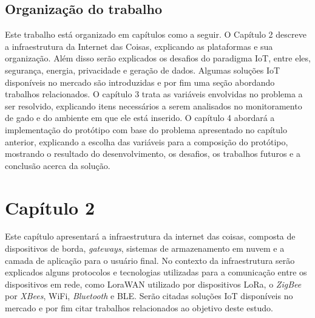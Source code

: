 \documentclass[
    hidelinks,
	12pt,				%
	openany,
	oneside, 
	a4paper,			%
	english,			%
	french,				%
	spanish,			%
	brazil				%
	]{abntex2}
\begin{document}
\section{Organização do trabalho}

Este trabalho está organizado em capítulos como a seguir. O Capítulo 2 descreve a infraestrutura da Internet das Coisas, explicando as plataformas e sua organização. Além disso serão explicados os desafios do paradigma IoT, entre eles,  segurança, energia, privacidade e geração de dados. Algumas soluções IoT disponíveis no mercado são introduzidas e por fim uma seção abordando trabalhos relacionados. O capítulo 3 trata as variáveis envolvidas no problema a ser resolvido, explicando itens necessários a serem analisados no monitoramento de gado e do ambiente em que ele está inserido. O capítulo 4 abordará a implementação do protótipo com base do problema apresentado no capítulo anterior, explicando a escolha das variáveis para a composição do protótipo, mostrando o resultado do desenvolvimento, os desafios, os trabalhos futuros e a conclusão acerca da solução.


\setcounter{section}{0}
\chapter*[Capítulo 2]{Capítulo 2} \label{cap2}

Este capítulo apresentará a infraestrutura da internet das coisas, composta de dispositivos de borda, \textit{gateways}, sistemas de armazenamento em nuvem e a camada de aplicação para o usuário final. No contexto da infraestrutura serão explicados alguns protocolos e tecnologias utilizadas para a comunicação entre os dispositivos em rede, como LoraWAN utilizado por dispositivos LoRa, o \textit{ZigBee} por \textit{XBees}, WiFi, \textit{Bluetooth} e BLE. Serão citadas soluções IoT disponíveis no mercado e por fim citar trabalhos relacionados ao objetivo deste estudo.
\end{document}
